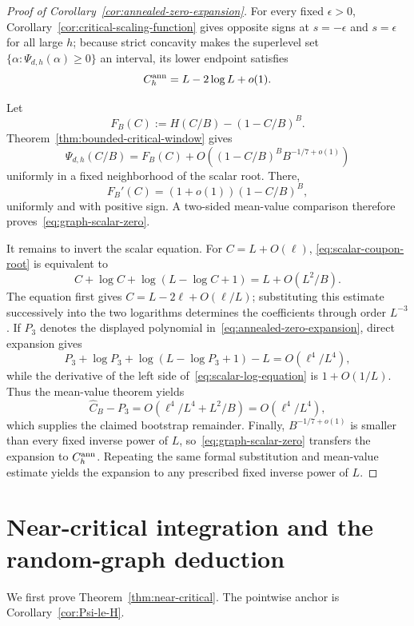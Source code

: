 \documentclass[11pt]{amsart}
\theoremstyle{definition}
\begin{document}
\begin{proof}[Proof of Corollary~\ref{cor:annealed-zero-expansion}]
For every fixed $\epsilon>0$, Corollary~\ref{cor:critical-scaling-function} gives opposite signs at $s=-\epsilon$ and $s=\epsilon$ for all large $h$; because strict concavity makes the superlevel set
$\{\alpha:\Psi_{d,h}(\alpha)\ge0\}$ an interval, its lower endpoint satisfies
\[
 C_h^{\rm ann}=L-2\log L+o(1).
\]

Let
\[
 F_B(C):=H(C/B)-(1-C/B)^B.
\]
Theorem~\ref{thm:bounded-critical-window} gives
\[
 \Psi_{d,h}(C/B)
 =F_B(C)+O\!\left((1-C/B)^B B^{-1/7+o(1)}\right)
\]
uniformly in a fixed neighborhood of the scalar root.  There,
\[
 F_B'(C)=(1+o(1))(1-C/B)^B,
\]
uniformly and with positive sign.  A two-sided mean-value comparison therefore proves~\eqref{eq:graph-scalar-zero}.

It remains to invert the scalar equation.  For $C=L+O(\ell)$,
\eqref{eq:scalar-coupon-root} is equivalent to
\begin{equation}\label{eq:scalar-log-equation}
 C+\log C+\log(L-\log C+1)
 =L+O(L^2/B).
\end{equation}
The equation first gives $C=L-2\ell+O(\ell/L)$; substituting this estimate successively into the two logarithms determines the coefficients through order $L^{-3}$.  If $P_3$ denotes the displayed polynomial in~\eqref{eq:annealed-zero-expansion}, direct expansion gives
\[
 P_3+\log P_3+\log(L-\log P_3+1)-L
 =O(\ell^4/L^4),
\]
while the derivative of the left side of~\eqref{eq:scalar-log-equation} is $1+O(1/L)$.  Thus the mean-value theorem yields
\[
 \widehat C_B-P_3
 =O(\ell^4/L^4+L^2/B)
 =O(\ell^4/L^4),
\]
which supplies the claimed bootstrap remainder.  Finally,
$B^{-1/7+o(1)}$ is smaller than every fixed inverse power of $L$, so~\eqref{eq:graph-scalar-zero} transfers the expansion to $C_h^{\rm ann}$.  Repeating the same formal substitution and mean-value estimate yields the expansion to any prescribed fixed inverse power of $L$.
\end{proof}

\section{Near-critical integration and the random-graph deduction}\label{sec:integration}
We first prove Theorem~\ref{thm:near-critical}.  The pointwise anchor is Corollary~\ref{cor:Psi-le-H}.
\end{document}
